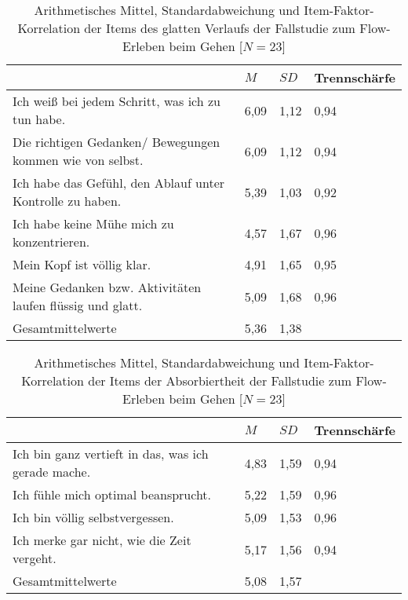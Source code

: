 \begin{table}[ht]
\centering
	\caption[Item-Faktor-Korrelation der Items des glatten Verlaufs (Fallstudie: Gehen)]{Arithmetisches Mittel, Standardabweichung und Item-Faktor-Korrelation der Items des glatten Verlaufs der Fallstudie zum Flow-Erleben beim Gehen [$N = 23$]}
	\label{tab:glatter_verlauf_fallstudie_gehen}
	\begin{tabularx}{\textwidth}{p{} p{} p{} p{}}
\toprule
& $M$ & $SD$ & Trennschärfe \\
\midrule
Ich weiß bei jedem Schritt, was ich zu tun habe. & 6,09 & 1,12 & 0,94 \\
Die richtigen Gedanken/ Bewegungen kommen wie von selbst. & 6,09 & 1,12 & 0,94 \\
Ich habe das Gefühl, den Ablauf unter Kontrolle zu haben. & 5,39 & 1,03 & 0,92 \\
Ich habe keine Mühe mich zu konzentrieren. & 4,57 & 1,67 & 0,96 \\
Mein Kopf ist völlig klar. & 4,91 & 1,65 & 0,95 \\
Meine Gedanken bzw. Aktivitäten laufen flüssig und glatt. & 5,09 & 1,68 & 0,96 \\
Gesamtmittelwerte & 5,36 & 1,38 & \\
\bottomrule
\end{tabularx}
\end{table}

\begin{table}[ht]
\centering
	\caption[Item-Faktor-Korrelation der Items der Absorbiertheit (Fallstudie: Gehen)]{Arithmetisches Mittel, Standardabweichung und Item-Faktor-Korrelation der Items der Absorbiertheit der Fallstudie zum Flow-Erleben beim Gehen [$N = 23$]}
	\label{tab:absorbiertheit_fallstudie_gehen}
	\begin{tabularx}{\textwidth}{p{} p{} p{} p{}}
\toprule
& $M$ & $SD$ & Trennschärfe \\
\midrule
Ich bin ganz vertieft in das, was ich gerade mache. & 4,83 & 1,59 & 0,94 \\
Ich fühle mich optimal beansprucht. & 5,22 & 1,59 & 0,96 \\
Ich bin völlig selbstvergessen. & 5,09 & 1,53 & 0,96 \\
Ich merke gar nicht, wie die Zeit vergeht. & 5,17 & 1,56 & 0,94 \\
Gesamtmittelwerte & 5,08 & 1,57 & \\
\bottomrule
\end{tabularx}
\end{table}

